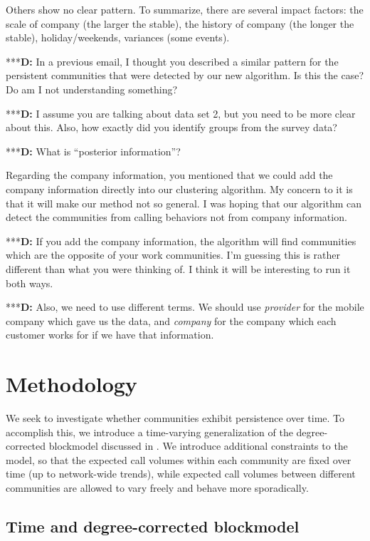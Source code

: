 \documentclass{article}
\begin{document}
Others show no clear pattern. To summarize, there are several impact factors: the scale of company (the larger the stable), the history of company (the longer the stable), holiday/weekends, variances (some events).

***\textbf{D:} In a previous email, I thought you described a similar pattern for the persistent communities that were detected by our new algorithm. Is this the case? Do am I not understanding something?

***\textbf{D:} I assume you are talking about data set 2, but you need to be more clear about this. Also, how exactly did you identify groups from the survey data?

***\textbf{D:} What is ``posterior information''?

Regarding the company information, you mentioned that we could add the company information directly into our clustering algorithm. My concern to it is that it will make our method not so general. I was hoping that our algorithm can detect the communities from calling behaviors not from company information. 

***\textbf{D:} If you add the company information, the algorithm will find communities which are the opposite of your work communities. I'm guessing this is rather different than what you were thinking of. I think it will be interesting to run it both ways.

***\textbf{D:} Also, we need to use different terms. We should use {\it provider} for the mobile company which gave us the data, and {\it company} for the company which each customer works for if we have that information.

\section{Methodology}

We seek to investigate whether communities exhibit persistence over time. To accomplish this, we introduce a time-varying generalization of the degree-corrected blockmodel discussed in \cite{karrer2011stochastic}. We introduce additional constraints to the model, so that the expected call volumes within each community are fixed over time (up to network-wide trends), while expected call volumes between different communities are allowed to vary freely and behave more sporadically. 


\subsection{Time and degree-corrected blockmodel}
\end{document}
